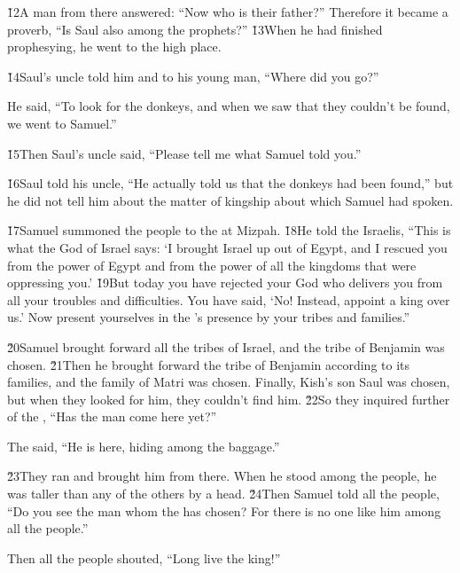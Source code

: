 \v{12}A man from there answered: ``Now who is their father?'' Therefore it became a proverb, ``Is Saul also among the prophets?'' \v{13}When he had finished prophesying, he went to the high place.

\v{14}Saul's uncle told him and to his young man, ``Where did you go?''

He said, ``To look for the donkeys, and when we saw that they couldn't be found, we went to Samuel.''

\v{15}Then Saul's uncle said, ``Please tell me what Samuel told you.''

\v{16}Saul told his uncle, ``He actually told us that the donkeys had been found,'' but he did not tell him about the matter of kingship about which Samuel had spoken.

\v{17}Samuel summoned the people to the  at Mizpah. \v{18}He told the Israelis, ``This is what the  God of Israel says: `I brought Israel up out of Egypt, and I rescued you from the power of Egypt and from the power of all the kingdoms that were oppressing you.' \v{19}But today you have rejected your God who delivers you from all your troubles and difficulties. You have said, `No! Instead, appoint a king over us.' Now present yourselves in the 's presence by your tribes and families.''

\v{20}Samuel brought forward all the tribes of Israel, and the tribe of Benjamin was chosen. \v{21}Then he brought forward the tribe of Benjamin according to its families, and the family of Matri was chosen. Finally, Kish's son Saul was chosen, but when they looked for him, they couldn't find him. \v{22}So they inquired further of the , ``Has the man come here yet?''

The  said, ``He is here, hiding among the baggage.''

\v{23}They ran and brought him from there. When he stood among the people, he was taller than any of the others by a head. \v{24}Then Samuel told all the people, ``Do you see the man whom the  has chosen? For there is no one like him among all the people.''

Then all the people shouted, ``Long live the king!''

